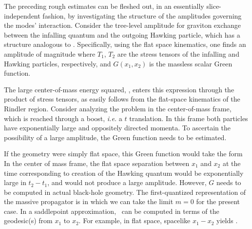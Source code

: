 
The preceding rough estimates can be fleshed out, in an essentially slice-independent fashion, by investigating the structure of the amplitudes governing the modes' interaction.  Consider the tree-level amplitude for graviton exchange between the infalling quantum and the outgoing Hawking particle, which has a structure analogous to \gravamp.  Specifically, using the flat space kinematics, one finds an amplitude of magnitude
%
\eqn{}
%
where $T_1$, $T_2$ are the stress tensors of the infalling and Hawking particles, respectively, and $G(x_1,x_2)$ is the massless scalar Green function.


The large center-of-mass energy squared, \largeinvt, enters this expression through the product of stress tensors, as easily follows from the flat-space kinematics of the Rindler region.  Consider analyzing the problem in the center-of-mass frame, which is reached through a boost, {\it i.e.} a $t$ translation.  In this frame both particles have exponentially large and oppositely directed momenta.
To ascertain the possibility of a large amplitude, the Green function needs to be estimated.

If the geometry were simply flat space, this Green function would take the form
%
\eqn{}
%
In the center of mass frame, the flat space separation between $x_1$ and $x_2$ at the time corresponding to creation of the Hawking quantum
would be exponentially large in $t_2-t_1$, and would not produce a large amplitude.  However, $G$ needs to be computed in actual black-hole geometry.  The first-quantized representation of the massive propagator is
%
\eqn{}
%
in which we can take the limit $m=0$ for the present case.   In a saddlepoint approximation, \mgreen\ can be computed in terms of the geodesic(s) from $x_1$ to $x_2$.  For example, in flat space, spacelike $x_1-x_2$ yields \flatgreen.

